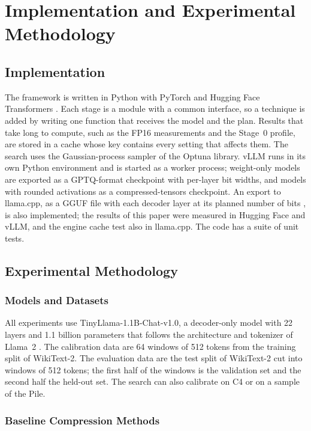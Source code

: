 \documentclass[num-refs]{wiley-article}
\begin{document}
\section{Implementation and Experimental Methodology}
\label{sec:method}

\subsection{Implementation}

The framework is written in Python with PyTorch and Hugging Face Transformers \cite{wolf2020transformers}. Each stage is a module with a common interface, so a technique is added by writing one function that receives the model and the plan. Results that take long to compute, such as the FP16 measurements and the Stage~0 profile, are stored in a cache whose key contains every setting that affects them. The search uses the Gaussian-process sampler of the Optuna library. vLLM runs in its own Python environment and is started as a worker process; weight-only models are exported as a GPTQ-format checkpoint with per-layer bit widths, and models with rounded activations as a compressed-tensors checkpoint. An export to llama.cpp, as a GGUF file with each decoder layer at its planned number of bits \cite{ggml2025gguf}, is also implemented; the results of this paper were measured in Hugging Face and vLLM, and the engine cache test also in llama.cpp. The code has a suite of unit tests.

\subsection{Experimental Methodology}

\subsubsection{Models and Datasets}

All experiments use TinyLlama-1.1B-Chat-v1.0, a decoder-only model with 22 layers and 1.1 billion parameters that follows the architecture and tokenizer of Llama~2 \cite{zhang2024tinyllama}. The calibration data are 64 windows of 512 tokens from the training split of WikiText-2. The evaluation data are the test split of WikiText-2 cut into windows of 512 tokens; the first half of the windows is the validation set and the second half the held-out set. The search can also calibrate on C4 or on a sample of the Pile.

\subsubsection{Baseline Compression Methods}
\end{document}
